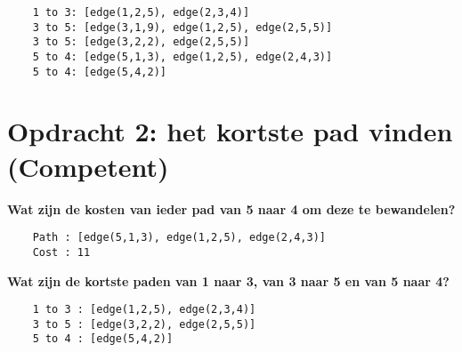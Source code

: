 \documentclass{uva-inf-article}
\begin{document}
\begin{lstlisting}
    1 to 3: [edge(1,2,5), edge(2,3,4)]
    3 to 5: [edge(3,1,9), edge(1,2,5), edge(2,5,5)]
    3 to 5: [edge(3,2,2), edge(2,5,5)]
    5 to 4: [edge(5,1,3), edge(1,2,5), edge(2,4,3)]
    5 to 4: [edge(5,4,2)]
\end{lstlisting}

\newpage
\section{Opdracht 2: het kortste pad vinden (Competent)}
\textbf{Wat zijn de kosten van ieder pad van 5 naar 4 om deze te bewandelen?}
\begin{lstlisting}
    Path : [edge(5,1,3), edge(1,2,5), edge(2,4,3)]
    Cost : 11
\end{lstlisting}
\textbf{Wat zijn de kortste paden van 1 naar 3, van 3 naar 5 en van 5 naar 4?}
\begin{lstlisting}
    1 to 3 : [edge(1,2,5), edge(2,3,4)]
    3 to 5 : [edge(3,2,2), edge(2,5,5)]
    5 to 4 : [edge(5,4,2)]
\end{lstlisting}


\printbibliography


\end{document}
